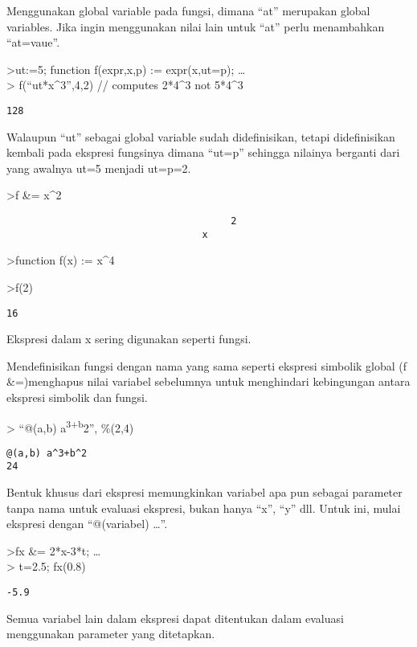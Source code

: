 \documentclass[
]{book}
\begin{document}
Menggunakan global variable pada fungsi, dimana ``at'' merupakan global variables. Jika ingin menggunakan nilai lain untuk ``at'' perlu menambahkan ``at=vaue''.

\textgreater ut:=5; function f(expr,x,p) := expr(x,ut=p); \ldots{}\\
\textgreater{} f(``ut*x\^{}3'',4,2) // computes 2*4\^{}3 not 5*4\^{}3

\begin{verbatim}
128
\end{verbatim}

Walaupun ``ut'' sebagai global variable sudah didefinisikan, tetapi didefinisikan kembali pada ekspresi fungsinya dimana ``ut=p'' sehingga nilainya berganti dari yang awalnya ut=5 menjadi ut=p=2.

\textgreater f \&= x\^{}2

\begin{verbatim}
                                       2
                                  x
\end{verbatim}

\textgreater function f(x) := x\^{}4

\textgreater f(2)

\begin{verbatim}
16
\end{verbatim}

Ekspresi dalam x sering digunakan seperti fungsi.

Mendefinisikan fungsi dengan nama yang sama seperti ekspresi simbolik global (f \&=)menghapus nilai variabel sebelumnya untuk menghindari kebingungan antara ekspresi simbolik dan fungsi.

\textgreater{} ``@(a,b) a\textsuperscript{3+b}2'', \%(2,4)

\begin{verbatim}
@(a,b) a^3+b^2
24
\end{verbatim}

Bentuk khusus dari ekspresi memungkinkan variabel apa pun sebagai parameter tanpa nama untuk evaluasi ekspresi, bukan hanya ``x'', ``y'' dll. Untuk ini, mulai ekspresi dengan ``@(variabel) \ldots{}''.

\textgreater fx \&= 2*x-3*t; \ldots{}\\
\textgreater{} t=2.5; fx(0.8)

\begin{verbatim}
-5.9
\end{verbatim}

Semua variabel lain dalam ekspresi dapat ditentukan dalam evaluasi menggunakan parameter yang ditetapkan.
\end{document}

